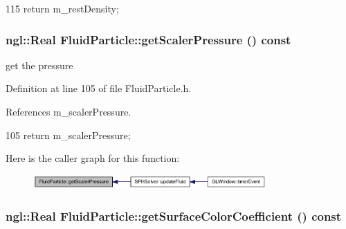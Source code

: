 \begin{DoxyCode}
115 { return m_restDensity; }
\end{DoxyCode}


\hypertarget{class_fluid_particle_ae0122ebaedcbf00aed6ab9b4f8559bf2}{
\subsubsection[{getScalerPressure}]{\setlength{\rightskip}{0pt plus 5cm}ngl::Real FluidParticle::getScalerPressure () const}}
\label{class_fluid_particle_ae0122ebaedcbf00aed6ab9b4f8559bf2}


get the pressure 



Definition at line 105 of file FluidParticle.h.



References m\_\-scalerPressure.




\begin{DoxyCode}
105 { return m_scalerPressure; }
\end{DoxyCode}




Here is the caller graph for this function:\nopagebreak
\begin{figure}[H]
\begin{center}
\leavevmode
\includegraphics[width=253pt]{class_fluid_particle_ae0122ebaedcbf00aed6ab9b4f8559bf2_icgraph}
\end{center}
\end{figure}


\hypertarget{class_fluid_particle_a367341528345883963d37185513a6983}{
\subsubsection[{getSurfaceColorCoefficient}]{\setlength{\rightskip}{0pt plus 5cm}ngl::Real FluidParticle::getSurfaceColorCoefficient () const}}
\label{class_fluid_particle_a367341528345883963d37185513a6983}



